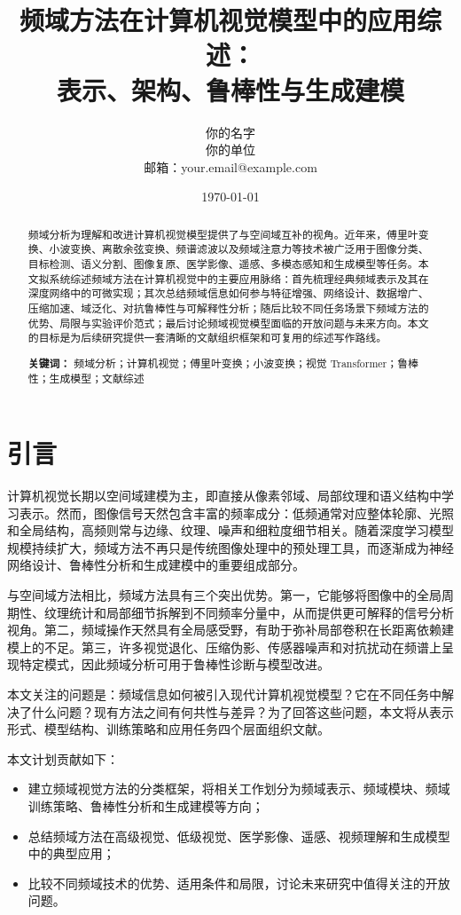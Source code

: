 \documentclass[12pt,a4paper]{article}
\title{\bfseries 频域方法在计算机视觉模型中的应用综述：\\ 表示、架构、鲁棒性与生成建模}
\author{你的名字\\你的单位\\邮箱：your.email@example.com}
\date{\today}
\begin{document}
\maketitle

\begin{abstract}
频域分析为理解和改进计算机视觉模型提供了与空间域互补的视角。近年来，傅里叶变换、小波变换、离散余弦变换、频谱滤波以及频域注意力等技术被广泛用于图像分类、目标检测、语义分割、图像复原、医学影像、遥感、多模态感知和生成模型等任务。本文拟系统综述频域方法在计算机视觉中的主要应用脉络：首先梳理经典频域表示及其在深度网络中的可微实现；其次总结频域信息如何参与特征增强、网络设计、数据增广、压缩加速、域泛化、对抗鲁棒性与可解释性分析；随后比较不同任务场景下频域方法的优势、局限与实验评价范式；最后讨论频域视觉模型面临的开放问题与未来方向。本文的目标是为后续研究提供一套清晰的文献组织框架和可复用的综述写作路线。

\noindent\textbf{关键词：} 频域分析；计算机视觉；傅里叶变换；小波变换；视觉 Transformer；鲁棒性；生成模型；文献综述
\end{abstract}

\section{引言}
计算机视觉长期以空间域建模为主，即直接从像素邻域、局部纹理和语义结构中学习表示。然而，图像信号天然包含丰富的频率成分：低频通常对应整体轮廓、光照和全局结构，高频则常与边缘、纹理、噪声和细粒度细节相关。随着深度学习模型规模持续扩大，频域方法不再只是传统图像处理中的预处理工具，而逐渐成为神经网络设计、鲁棒性分析和生成建模中的重要组成部分。

与空间域方法相比，频域方法具有三个突出优势。第一，它能够将图像中的全局周期性、纹理统计和局部细节拆解到不同频率分量中，从而提供更可解释的信号分析视角。第二，频域操作天然具有全局感受野，有助于弥补局部卷积在长距离依赖建模上的不足。第三，许多视觉退化、压缩伪影、传感器噪声和对抗扰动在频谱上呈现特定模式，因此频域分析可用于鲁棒性诊断与模型改进。

本文关注的问题是：频域信息如何被引入现代计算机视觉模型？它在不同任务中解决了什么问题？现有方法之间有何共性与差异？为了回答这些问题，本文将从表示形式、模型结构、训练策略和应用任务四个层面组织文献。

本文计划贡献如下：
\begin{itemize}
    \item 建立频域视觉方法的分类框架，将相关工作划分为频域表示、频域模块、频域训练策略、鲁棒性分析和生成建模等方向；
    \item 总结频域方法在高级视觉、低级视觉、医学影像、遥感、视频理解和生成模型中的典型应用；
    \item 比较不同频域技术的优势、适用条件和局限，讨论未来研究中值得关注的开放问题。
\end{itemize}
\end{document}
